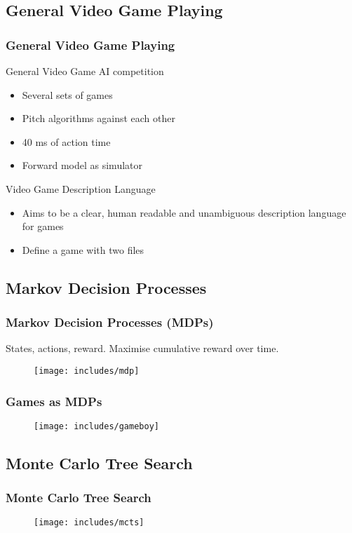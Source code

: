 \documentclass[aspectratio=169]{beamer}
\begin{document}
\subsection{General Video Game Playing}
\begin{frame}
	\frametitle{General Video Game Playing \cite{perez2014, schaul2013video}}
	\begin{block}{General Video Game AI competition}
		\begin{itemize}
			\item Several sets of games
			\item Pitch algorithms against each other
			\item 40 ms of action time
			\item Forward model as simulator
		\end{itemize}
	\end{block}
	\begin{block}{Video Game Description Language}
		\begin{itemize}
			\item Aims to be a clear, human readable and unambiguous
				description language for games
			\item Define a game with two files
		\end{itemize}
	\end{block}
\end{frame}

\subsection{Markov Decision Processes}
\begin{frame}
	\frametitle{Markov Decision Processes (MDPs) \cite{sutton1998reinforcement}}
	States, actions, reward. Maximise cumulative reward over time.
	\begin{figure}
	\centering
	\texttt{[image: includes/mdp]}
	\end{figure}
\end{frame}
\begin{frame}
	\frametitle{Games as MDPs}
	\begin{figure}
	\centering
	\texttt{[image: includes/gameboy]}
	\end{figure}
\end{frame}

\subsection{Monte Carlo Tree Search}
\begin{frame}
	\frametitle{Monte Carlo Tree Search\cite{gelly2006modification}}
	\begin{figure}
	\centering
	\texttt{[image: includes/mcts]}
	\end{figure}
\end{frame}
\end{document}
